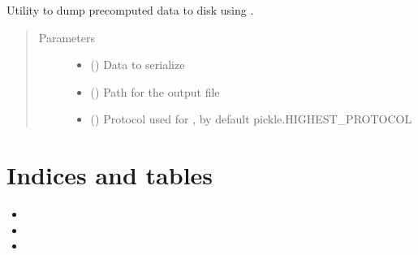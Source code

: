 \documentclass[letterpaper,10pt,english]{sphinxmanual}
\begin{document}

\begin{fulllineitems}
\label{\detokenize{code:utils.store_serialized_data}}
\sphinxAtStartPar
Utility to dump precomputed data to disk using .
\begin{quote}\begin{description}
\item[{Parameters}] \leavevmode\begin{itemize}
\item {} 
\sphinxAtStartPar
{} () \textendash{} Data to serialize

\item {} 
\sphinxAtStartPar
{} (\sphinxstyleliteralemphasis{\sphinxupquote{, }}) \textendash{} Path for the output file

\item {} 
\sphinxAtStartPar
{} (\sphinxstyleliteralemphasis{\sphinxupquote{, }}) \textendash{} Protocol used for , by default pickle.HIGHEST\_PROTOCOL

\end{itemize}

\end{description}\end{quote}

\end{fulllineitems}



\chapter{Indices and tables}
\label{\detokenize{index:indices-and-tables}}\begin{itemize}
\item {} 
\sphinxAtStartPar
{}

\item {} 
\sphinxAtStartPar
{}

\item {} 
\sphinxAtStartPar
{}

\end{itemize}
\end{document}
